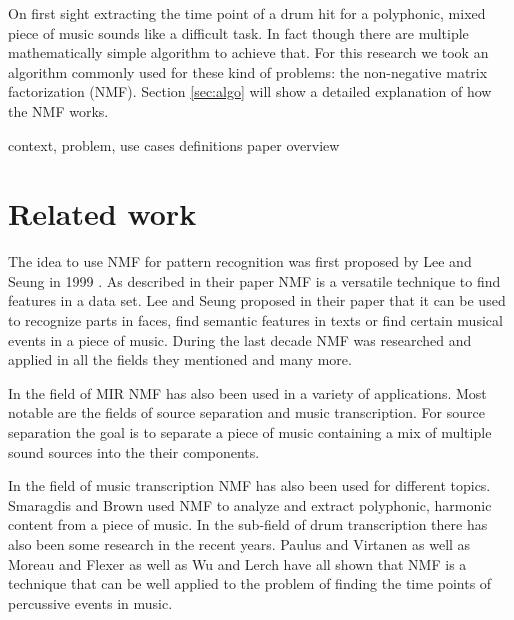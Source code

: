 \documentclass{article}
\begin{document}
On first sight extracting the time point of a drum hit for a polyphonic, mixed piece of music sounds like a difficult task.
In fact though there are multiple mathematically simple algorithm to achieve that.
For this research we took an algorithm commonly used for these kind of problems: the non-negative matrix factorization (NMF).
Section \ref{sec:algo} will show a detailed explanation of how the NMF works.


\noindent\makebox[\linewidth]{\rule{\linewidth}{0.4pt}}
context, problem, use cases
definitions
paper overview




\section{Related work}
\label{sec:rel}

The idea to use NMF for pattern recognition was first proposed by Lee and Seung in 1999 \cite{lee1999}.
As described in their paper NMF is a versatile technique to find features in a data set.
Lee and Seung proposed in their paper that it can be used to recognize parts in faces, find semantic features in texts or find certain musical events in a piece of music.
During the last decade NMF was researched and applied in all the fields they mentioned and many more.

In the field of MIR NMF has also been used in a variety of applications.
Most notable are the fields of source separation and music transcription.
For source separation the goal is to separate a piece of music containing a mix of multiple sound sources into the their components.
\cite{virtanen2007}

In the field of music transcription NMF has also been used for different topics.
Smaragdis and Brown \cite{smaragdis2003} used NMF to analyze and extract polyphonic, harmonic content from a piece of music.
In the sub-field of drum transcription there has also been some research in the recent years.
Paulus and Virtanen \cite{paulus2005} as well as Moreau and Flexer \cite{moreau2007} as well as Wu and Lerch \cite{wu2015} have all shown that NMF is a technique that can be well applied to the problem of finding the time points of percussive events in music.
\end{document}
